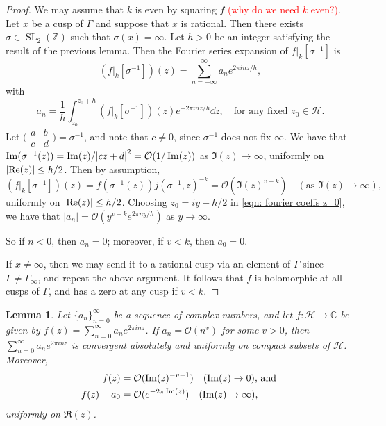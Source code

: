 \documentclass[10pt,leqno,twoside]{article}
\theoremstyle{plain}
\newtheorem{lemma}[lem]{Lemma}
\theoremstyle{definition}
\numberwithin{equation}{section}
\numberwithin{lem}{section}
\DeclareMathOperator{\SL}{SL}
\newcommand{\smallabcd}{\big(\!\begin{smallmatrix}
    a & b \\ c & d
\end{smallmatrix}\!\big)}
\newcommand{\slz}{\SL_2(\mathbb{Z})}
\newcommand{\sai}[1]{\textcolor{red}{#1}}
\begin{document}
\begin{proof}
    We may assume that $k$ is even by squaring $f$ \sai{(why do we need $k$ even?)}. Let $x$ be a cusp of $\varGamma$ and suppose that $x$ is rational. Then there exists $\sigma\in\slz$ such that $\sigma(x) = \infty$. Let $h>0$ be an integer satisfying the result of the previous lemma. Then the Fourier series expansion of $f|_k[\sigma^{-1}]$ is 
    \[(f|_k[\sigma^{-1}])(z) = \sum_{n=-\infty}^\infty a_ne^{2\pi i n z/h},\] with \begin{equation}\label{eqn: fourier coeffs z_0}
        a_n = \frac{1}{h}\int_{z_0}^{z_0+h}(f|_k[\sigma^{-1}])(z)e^{-2\pi i n z/h}\dd z,\quad \text{for any fixed $z_0\in\mathcal H$.}
    \end{equation} Let $\smallabcd = \sigma^{-1}$, and note that $c\neq 0$, since $\sigma^{-1}$ does not fix $\infty$. We have that $\Im(\sigma^{-1}(z)) = \Im(z)/\abs{cz+d}^2 = \mathcal O(1/\Im(z))$ as $\Im(z)\to\infty$, uniformly on $\abs{\Re(z)}\leq h/2$. Then by assumption,
    \[(f|_k[\sigma^{-1}])(z) = f(\sigma^{-1}(z))j(\sigma^{-1},z)^{-k} = \mathcal O(\Im(z)^{v-k})\quad (\text{as }\Im(z)\to\infty),\] uniformly on $\abs{\Re(z)}\leq h/2$. Choosing $z_0 = iy-h/2$ in \cref{eqn: fourier coeffs z_0}, we have that $|a_n| = \mathcal O(y^{v-k}e^{2\pi n y /h})$ as $y\to\infty$.

    So if $n<0$, then $a_n = 0$; moreover, if $v<k$, then $a_0 = 0$. 

    If $x\neq\infty$, then we may send it to a rational cusp via an element of $\varGamma$ since $\varGamma\neq \varGamma_\infty$, and repeat the above argument. It follows that $f$ is holomorphic at all cusps of $\varGamma$, and has a zero at any cusp if $v<k$.
\end{proof}
\begin{lemma}\label{lem: miyake lem 4.3.3}
    Let $\{a_n\}_{n=0}^\infty$ be a sequence of complex numbers, and let $f\colon \mathcal H\to \mathbb C$ be given by $f(z) = \sum_{n=0}^\infty a_ne^{2\pi i nz}$. If $a_n = \mathcal O(n^v)$ for some $v >0$, then $\sum_{n=0}^\infty a_ne^{2\pi i nz}$ is convergent absolutely and uniformly on compact subsets of $\mathcal H$. Moreover, 
    \begin{align*}
        f(z) &= \mathcal O(\Im(z)^{-v-1}) \quad\textup{($\Im(z) \to 0$), and }\\
        f(z) - a_0 &= \mathcal O(e^{-2\pi \Im(z)}) \quad\textup{($\Im(z) \to \infty$)},
    \end{align*}
    uniformly on $\Re(z)$.
\end{lemma}
\end{document}
